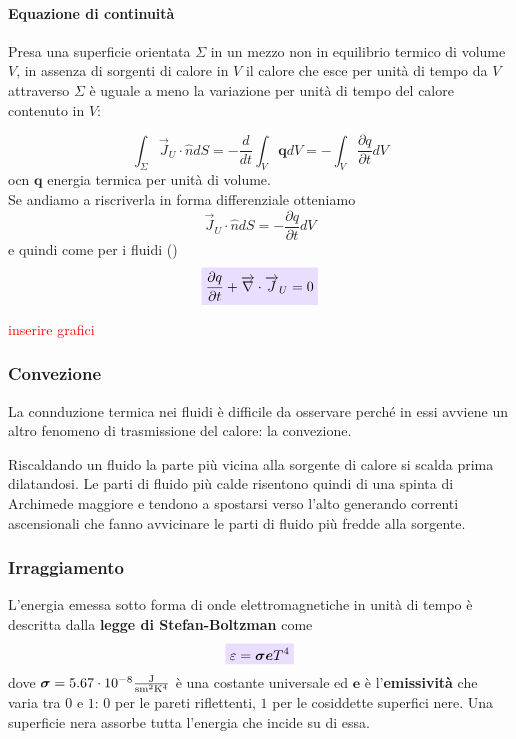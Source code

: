 \documentclass[x11names]{article}
\newcommand{\viola}[1]{\colorbox{yred}{$\displaystyle #1$}}
\begin{document}
	\paragraph{Equazione di continuità} Presa una superficie orientata \(\Sigma\) in un mezzo non in equilibrio termico di volume \(V\), in assenza di sorgenti di calore in \(V\) il calore che esce per unità di tempo da \(V\) attraverso \(\Sigma\) è uguale a meno la variazione per unità di tempo del calore contenuto in \(V\):
	
	\[ 
	\int_{\Sigma} \overrightarrow{J}_U \cdot \hat{n} dS = -\frac{d}{dt}\int_V \boldsymbol{q} dV = - \int_V \frac{\partial q}{\partial t} dV
	\]
	ocn \(\boldsymbol{q}\) energia termica per unità di volume. \\
	
	\noindent
	Se andiamo a riscriverla in forma differenziale otteniamo
	\[ 
	\overrightarrow{J}_U \cdot \hat{n}dS = - \frac{\partial q}{\partial t} dV
	\]
	e quindi come per i fluidi ()
	\begin{equation}
	\viola{	\frac{\partial q}{\partial t} + \overrightarrow{\nabla} \cdot \overrightarrow{J}_U  = 0 }
	\end{equation}
	
	\begin{center}
		\textcolor{red}{inserire grafici}
	\end{center}
	
	
	\subsubsection{Convezione}
	La connduzione termica nei fluidi è difficile da osservare perché in essi avviene un altro fenomeno di trasmissione del calore: la convezione.
	
	Riscaldando un fluido la parte più vicina alla sorgente di calore si scalda prima dilatandosi. Le parti di fluido più calde risentono quindi di una spinta di Archimede maggiore e tendono a spostarsi verso l'alto generando correnti ascensionali che fanno avvicinare le parti di fluido più fredde alla sorgente. 
	
	\subsubsection{Irraggiamento}
	L'energia emessa sotto forma di onde elettromagnetiche in unità di tempo è descritta dalla \textbf{legge di Stefan-Boltzman} come
	\begin{equation}\label{stefan boltzman}
		\viola{\varepsilon = \boldsymbol{\sigma e}T^4}
	\end{equation}
	dove \(\boldsymbol{\sigma} = 5.67\cdot 10^{-8}\SI{}{\frac{\joule}{\second\meter^2\kelvin^4}}\) è una costante universale ed \(\boldsymbol{e}\) è l'\textbf{emissività} che varia tra \(0\) e \(1\): \(0\) per le pareti riflettenti, \(1\) per le cosiddette superfici nere. Una superficie nera assorbe tutta l'energia che incide su di essa.
	
\end{document}
